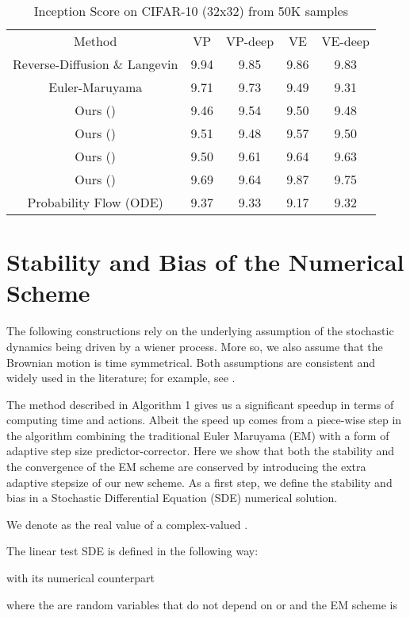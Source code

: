 \documentclass{article}
\begin{document}
\begin{table}[!htbp]
	\caption{Inception Score on CIFAR-10 (32x32) from 50K samples}
	\label{tab:table3}
	\centering
	\begin{tabular}{ccccc}
		\toprule
		Method & VP & VP-deep & VE & VE-deep \\
		\cmidrule(){1-5}
		Reverse-Diffusion \& Langevin  & 9.94 & 9.85 &  9.86 &  9.83 \\
		\cmidrule(){1-5}
		Euler-Maruyama & 9.71 & 9.73 & 9.49 & 9.31 \\
		Ours () & 9.46 & 9.54 & 9.50 & 9.48 \\
		Ours () & 9.51 & 9.48 & 9.57 & 9.50 \\
		Ours () & 9.50 & 9.61 & 9.64 & 9.63 \\
		Ours () & 9.69 & 9.64 & 9.87 & 9.75 \\
		Probability Flow (ODE) & 9.37 & 9.33 & 9.17 & 9.32 \\
		\bottomrule
	\end{tabular}
\end{table}

\section{Stability and Bias of the Numerical Scheme}\label{sec:stability}
The following constructions rely on the underlying
assumption of the stochastic dynamics being driven by a wiener process.
More so, we also assume that the Brownian motion is
time symmetrical. Both assumptions are consistent and widely used
in the literature; for example, see \citep{gardiner2009stochastic}
\citep{arnold1974stochastic}.

The method described in Algorithm 1 gives us a significant speedup
in terms of computing time and actions. Albeit the speed up comes from
a piece-wise step in the algorithm combining the traditional Euler
Maruyama (EM) with a form of adaptive step size predictor-corrector.
Here we show that both the stability and the convergence of the EM
scheme are conserved by introducing the extra adaptive stepsize
of our new scheme. As a first step, we define the stability and bias
in a Stochastic Differential Equation (SDE) numerical solution. 

We denote  as the real value of a complex-valued .

The linear test SDE is defined in the following way:

with its numerical counterpart 

 where the  are random variables that do not depend on 
or  and the EM scheme is 
\end{document}
